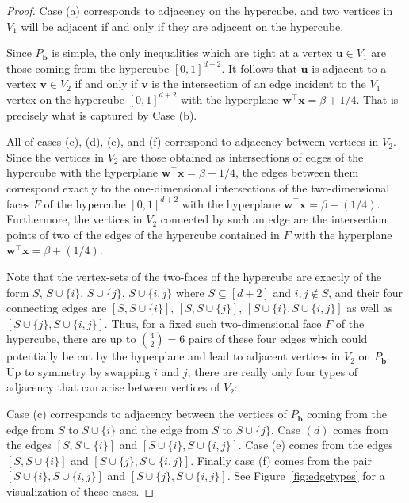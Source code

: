 \documentclass[centering,11pt,reqno]{amsart}
\theoremstyle{definition}
\begin{document}
\begin{proof}
Case (a) corresponds to adjacency on the hypercube, and two vertices in $V_{1}$ will be adjacent if and only if they are adjacent on the hypercube. 

Since $P_\mathbf{b}$ is simple, the only inequalities which are tight at a vertex $\mathbf{u}\in V_{1}$ are those coming from the hypercube $[0,1]^{d+2}$. It follows that $\mathbf{u}$ is adjacent to a vertex $\mathbf{v}\in V_{2}$ if and only if $\mathbf{v}$ is the intersection of an edge incident to the $V_{1}$ vertex on the hypercube $[0,1]^{d+2}$ with the hyperplane $\mathbf{w}^\intercal \mathbf{x}=\beta+1/4$. That is precisely what is captured by Case (b). 

All of cases (c), (d), (e), and (f) correspond to adjacency between vertices in $V_2$. Since the vertices in $V_2$ are those obtained as intersections of edges of the hypercube with the hyperplane $\mathbf{w}^\intercal\mathbf{x}=\beta+1/4$, the edges between them correspond exactly to the one-dimensional intersections of the two-dimensional faces $F$ of the hypercube $[0,1]^{d+2}$ with the hyperplane $\mathbf{w}^{\intercal} \mathbf{x} = \beta +(1/4)$. Furthermore, the vertices in $V_2$ connected by such an edge are the intersection points of two of the edges of the hypercube contained in $F$ with the hyperplane $\mathbf{w}^{\intercal} \mathbf{x} = \beta +(1/4)$. 

Note that the vertex-sets of the two-faces of the hypercube are exactly of the form $S$, $S \cup \{i\}$, $S \cup \{j\}$, $S \cup \{i,j\}$ where $S\subseteq [d+2]$ and $i,j\notin S$, and their four connecting edges are $[S, S\cup\{i\}]$, $[S, S\cup\{j\}]$, $[S\cup\{i\}, S\cup \{i,j\}]$ as well as $[S\cup\{j\}, S\cup \{i,j\}]$. Thus, for a fixed such two-dimensional face $F$ of the hypercube, there are up to $\binom{4}{2} = 6$ pairs of these four edges which could potentially be cut by the hyperplane and lead to adjacent vertices in $V_2$ on $P_\mathbf{b}$. Up to symmetry by swapping $i$ and $j$, there are really only four types of adjacency that can arise between vertices of $V_2$:

Case (c) corresponds to adjacency between the vertices of $P_{\mathbf{b}}$ coming from the edge from $S$ to $S \cup \{i\}$ and the edge from $S$ to $S \cup \{j\}$. Case $(d)$ comes from the edges $[S, S\cup \{i\}]$ and $[S \cup \{i\}, S \cup \{i,j\}]$. Case (e) comes from the edges $[S, S \cup \{i\}]$ and $[S \cup \{j\}, S \cup \{i,j\}]$. Finally case (f) comes from the pair $[S \cup \{i\}, S \cup \{i,j\}]$ and $[S \cup \{j\}, S \cup \{i,j\}]$. See Figure~\ref{fig:edgetypes} for a visualization of these cases.
\end{proof}
\end{document}
